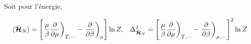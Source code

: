 Soit pour l'énergie, 

\begin{eqnarray}
	\langle \hat{\bm{\mathcal{H}}}_N \rangle  = \left [ \left .\frac{\mu}{\beta} \frac{ \partial}{\partial \mu } \right )_{T,\cdots} -\left . \frac{ \partial }{\partial \beta } \right )_\mu  \right ]\ln Z,  & & \Delta^2_{\hat{\bm{\mathcal{H}}}_N } = \left [ \left .\frac{\mu}{\beta} \frac{ \partial}{\partial \mu } \right )_{T,\cdots} -\left . \frac{ \partial }{\partial \beta } \right )_{\mu,\cdots}  \right ]^2\ln Z		
\end{eqnarray}


	
	
